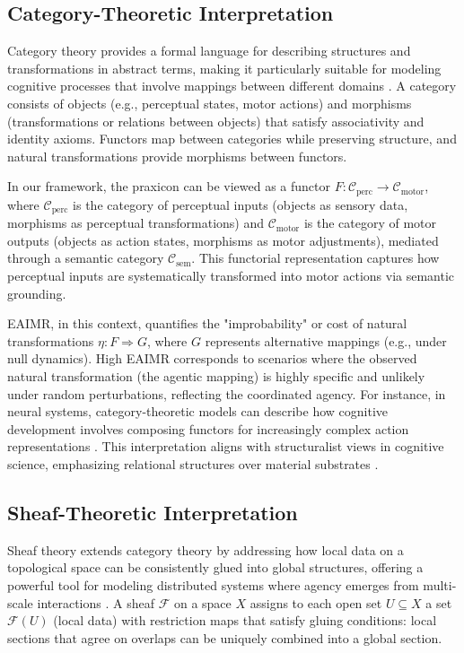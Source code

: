 \documentclass{article}
\begin{document}
\subsection{Category-Theoretic Interpretation}
Category theory provides a formal language for describing structures and transformations in abstract terms, making it particularly suitable for modeling cognitive processes that involve mappings between different domains \citep{healy2022, phillips2021}. A category consists of objects (e.g., perceptual states, motor actions) and morphisms (transformations or relations between objects) that satisfy associativity and identity axioms. Functors map between categories while preserving structure, and natural transformations provide morphisms between functors.

In our framework, the praxicon can be viewed as a functor \(F: \mathcal{C}_{\text{perc}} \to \mathcal{C}_{\text{motor}}\), where \(\mathcal{C}_{\text{perc}}\) is the category of perceptual inputs (objects as sensory data, morphisms as perceptual transformations) and \(\mathcal{C}_{\text{motor}}\) is the category of motor outputs (objects as action states, morphisms as motor adjustments), mediated through a semantic category \(\mathcal{C}_{\text{sem}}\). This functorial representation captures how perceptual inputs are systematically transformed into motor actions via semantic grounding.

EAIMR, in this context, quantifies the "improbability" or cost of natural transformations \(\eta: F \Rightarrow G\), where \(G\) represents alternative mappings (e.g., under null dynamics). High EAIMR corresponds to scenarios where the observed natural transformation (the agentic mapping) is highly specific and unlikely under random perturbations, reflecting the coordinated agency. For instance, in neural systems, category-theoretic models can describe how cognitive development involves composing functors for increasingly complex action representations \citep{ehresmann1980}. This interpretation aligns with structuralist views in cognitive science, emphasizing relational structures over material substrates \citep{ehresmann2021}.

\subsection{Sheaf-Theoretic Interpretation}
Sheaf theory extends category theory by addressing how local data on a topological space can be consistently glued into global structures, offering a powerful tool for modeling distributed systems where agency emerges from multi-scale interactions \citep{spivak2024}. A sheaf \(\mathcal{F}\) on a space \(X\) assigns to each open set \(U \subseteq X\) a set \(\mathcal{F}(U)\) (local data) with restriction maps that satisfy gluing conditions: local sections that agree on overlaps can be uniquely combined into a global section.
\end{document}
